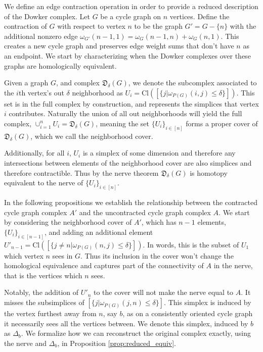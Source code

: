 \documentclass[pdflatex,bst/sn-mathphys-num]{sn-jnl}%
\theoremstyle{thmstyleone}%
\theoremstyle{definition}
\theoremstyle{thmstyletwo}%
\newcommand{\FD}{\mathfrak{D}}
\theoremstyle{thmstylethree}%
\begin{document}
We define an edge contraction operation in order to provide a reduced description of the Dowker complex. Let $G$ be a cycle graph on $n$ vertices. Define the contraction of $G$ with respect to vertex $n$ to be the graph $G'=G-\{n\}$ with the additional nonzero edge $\omega_{G'} (n-1,1) = \omega_G(n-1,n)+\omega_G(n,1)$. This creates a new cycle graph and preserves edge weight sums that don't have $n$ as an endpoint. We start by characterizing when the Dowker complexes over these graphs are homologically equivalent.


Given a graph $G$, and complex $\FD_\delta(G)$,  we denote the subcomplex associated to the $i$th vertex's out $\delta$ neighborhood as  $U_i=\text{Cl}([\{j| \omega_{P(G)}(i,j)\leq \delta\}])$. This set is in the full complex by construction, and represents the simplices that vertex $i$ contributes. Naturally the union of all out neighborhoods will yield the full complex, $\cup_{i=1}^n U_i = \FD_\delta (G)$, meaning the set $\{U_i\}_{i\in [n]}$ forms a proper cover of $\FD_\delta(G)$, which we call the neighborhood cover.

Additionally, for all $i$, $U_i$ is a simplex of some dimension and therefore any intersections between elements of the neighborhood cover are also simplices and therefore contractible. Thus by the nerve theorem $\FD_\delta(G)$ is homotopy equivalent to the nerve of $\{U_i\}_{i\in [n]}$.

In the following propositions we establish the relationship between the contracted cycle graph complex $A'$ and the uncontracted cycle graph complex $A$. We start by considering the neighborhood cover of $A'$, which has $n-1$ elements, $\{U_i\}_{i\in [n-1]}$, and adding an additional element ${U'}_{n-1}=\text{Cl}([\{j\neq n | \omega_{P(G)}(n,j)\leq \delta\}])$. In words, this is the subset of $U_1$ which vertex $n$ sees in $G$. Thus its inclusion in the cover won't change the homological equivalence and captures part of the connectivity of $A$ in the nerve, that is the vertices which $n$ sees.  

Notably, the addition of $U'_n$ to the cover will not make the nerve equal to $A$. It misses the subsimplices of $[\{j|\omega_{P(G)}(j,n)\leq \delta\}]$. This simplex is induced by the vertex furthest away from $n$, say $b$, as on a consistently oriented cycle graph it necessarily sees all the vertices between. We denote this simplex, induced by $b$ as $\Delta_b$. We formalize how we can reconstruct the original complex exactly, using the nerve and $\Delta_b$, in Proposition \ref{prop:reduced_equiv}.
\end{document}

